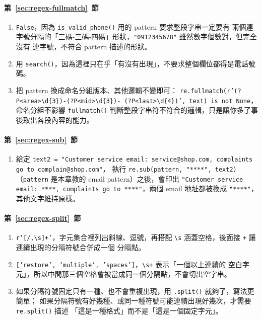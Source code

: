 \paragraph{第~\ref{sec:regex-fullmatch}~節}
\begin{enumerate}
\item \texttt{False}，因為 \texttt{is\_valid\_phone()} 用的 pattern 要求整段字串一定要有
兩個連字號分隔的「三碼-三碼-四碼」形狀，\texttt{"0912345678"} 雖然數字個數對，但完全沒有
連字號，不符合 pattern 描述的形狀。
\item 用 \texttt{search()}，因為這裡只在乎「有沒有出現」，不要求整個欄位都得是電話號碼。
\item 把 pattern 換成命名分組版本、其他邏輯不變即可：
\texttt{re.fullmatch(r'(?P<area>\textbackslash d\{3\})-(?P<mid>\textbackslash d\{3\})-%
(?P<last>\textbackslash d\{4\})', text) is not None}，命名分組不影響 \texttt{fullmatch()}
判斷整段字串符不符合的邏輯，只是讓你多了事後取出各段內容的能力。
\end{enumerate}

\paragraph{第~\ref{sec:regex-sub}~節}
\begin{enumerate}
\item 給定 \texttt{text2 = "Customer service email: service@shop.com, complaints go to complain@shop.com"}，
執行 \texttt{re.sub(pattern, "****", text2)}（\texttt{pattern} 是本章教的 email
pattern）之後，會印出 \texttt{"Customer service email: ****, complaints go to ****"}，兩個 email 地址都被換成
\texttt{"****"}，其他文字維持原樣。
\end{enumerate}

\paragraph{第~\ref{sec:regex-split}~節}
\begin{enumerate}
\item \texttt{r'[/,\textbackslash s]+'}，字元集合裡列出斜線、逗號，再搭配
\texttt{\textbackslash s} 涵蓋空格，後面接 \texttt{+} 讓連續出現的分隔符號合併成一個
分隔點。
\item \texttt{['restore', 'multiple', 'spaces']}，\texttt{\textbackslash s+} 表示「一個以上連續的
空白字元」，所以中間那三個空格會被當成同一個分隔點，不會切出空字串。
\item 如果分隔符號固定只有一種、也不會重複出現，用 \texttt{.split()} 就夠了，寫法更簡單；
如果分隔符號有好幾種、或同一種符號可能連續出現好幾次，才需要 \texttt{re.split()} 描述
「這是一種格式」而不是「這是一個固定字元」。
\end{enumerate}

